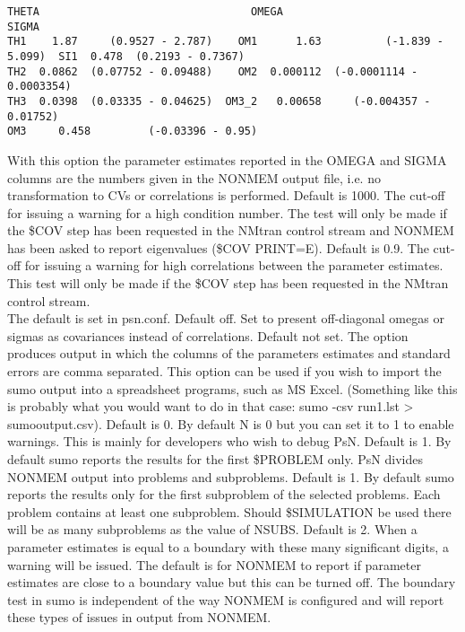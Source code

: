 \begin{optionlist}
\begin{verbatim}
THETA                                 OMEGA                                 SIGMA                     
TH1    1.87     (0.9527 - 2.787)    OM1      1.63          (-1.839 - 5.099)  SI1  0.478  (0.2193 - 0.7367)  
TH2  0.0862  (0.07752 - 0.09488)    OM2  0.000112  (-0.0001114 - 0.0003354)                                 
TH3  0.0398  (0.03335 - 0.04625)  OM3_2   0.00658     (-0.004357 - 0.01752)                                 
OM3     0.458         (-0.03396 - 0.95)
\end{verbatim}
With this option the parameter estimates reported in the OMEGA and SIGMA columns are the numbers given in the NONMEM output file, i.e. no transformation to CVs or correlations is performed. 
\nextopt
{}
Default is 1000. The cut-off for issuing a warning for a high condition number. The test will only be made if the \$COV step has been requested in the NMtran control stream and NONMEM has been asked to report eigenvalues (\$COV PRINT=E).
\nextopt
{}
Default is 0.9. The cut-off for issuing a warning for high correlations between the parameter estimates. This test will only be made if the \$COV step has been requested in the NMtran control stream. \\
The default is set in psn.conf. 
\nextopt
{}
    Default off. Set to present off-diagonal omegas or sigmas as covariances
    instead of correlations.
\nextopt
{}
Default not set. The option produces output in which the columns of the parameters estimates and standard errors are comma separated. This option can be used if you wish to import the sumo output into a spreadsheet programs, such as MS Excel. (Something like this is probably what you would want to do in that case: sumo -csv run1.lst > sumooutput.csv). 
\nextopt
{}
Default is 0. By default N is 0 but you can set it to 1 to enable warnings. This is mainly for developers who wish to debug PsN.
\nextopt
{}
Default is 1. By default sumo reports the results for the first \$PROBLEM only. PsN divides NONMEM output into problems and subproblems.
\nextopt
{}
Default is 1. By default sumo reports the results only for the first subproblem of the selected problems. Each problem contains at least one subproblem. Should \$SIMULATION be used there will be as many subproblems as the value of NSUBS. 
\nextopt
\newpage
{}
Default is 2. When a parameter estimates is equal to a boundary with these many significant digits, a warning will be issued. The default is for NONMEM to report if parameter estimates are close to a boundary value but this can be turned off. The boundary test in sumo is independent of the way NONMEM is configured and will report these types of issues in output from NONMEM. 

\end{optionlist}
